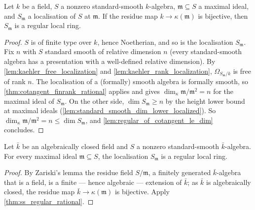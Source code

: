 \begin{theorem}
  \label{thm:ss_regular_rational}
  \leanok
  Let \(k\) be a field, \(S\) a nonzero standard-smooth \(k\)-algebra,
  \(\mathfrak m \subseteq S\) a maximal ideal, and \(S_{\mathfrak m}\) a
  localisation of \(S\) at \(\mathfrak m\). If the residue map
  \(k \to \kappa(\mathfrak m)\) is bijective, then \(S_{\mathfrak m}\) is a
  regular local ring.
\end{theorem}
\begin{proof}
  \leanok
  \(S\) is of finite type over \(k\), hence Noetherian, and so is the
  localisation \(S_{\mathfrak m}\). Fix \(n\) with \(S\) standard smooth of
  relative dimension \(n\) (every standard-smooth algebra has a presentation
  with a well-defined relative dimension). By
  \ref{lem:kaehler_free_localization} and \ref{lem:kaehler_rank_localization},
  \(\Omega_{S_{\mathfrak m}/k}\) is free of rank \(n\). The localisation of a
  (formally) smooth algebra is formally smooth, so
  \ref{thm:cotangent_finrank_rational} applies and gives
  \(\dim_\kappa \mathfrak m/\mathfrak m^2 = n\) for the maximal ideal of
  \(S_{\mathfrak m}\). On the other side,
  \(\dim S_{\mathfrak m} \geq n\) by the height lower bound at maximal ideals
  (\ref{lem:standard_smooth_dim_lower_localized}). So
  \(\dim_\kappa \mathfrak m/\mathfrak m^2 = n \leq \dim S_{\mathfrak m}\),
  and \ref{lem:regular_of_cotangent_le_dim} concludes.
\end{proof}

\begin{theorem}
  \label{thm:ss_regular_closed}
  \leanok
  Let \(\bar k\) be an algebraically closed field and \(S\) a nonzero
  standard-smooth \(\bar k\)-algebra. For every maximal ideal
  \(\mathfrak m \subseteq S\), the localisation \(S_{\mathfrak m}\) is a
  regular local ring.
\end{theorem}
\begin{proof}
  \leanok
  By Zariski's lemma the residue field \(S/\mathfrak m\), a finitely generated
  \(\bar k\)-algebra that is a field, is a finite --- hence algebraic ---
  extension of \(\bar k\); as \(\bar k\) is algebraically closed, the residue
  map \(\bar k \to \kappa(\mathfrak m)\) is bijective. Apply
  \ref{thm:ss_regular_rational}.
\end{proof}

